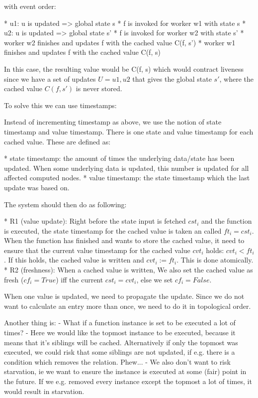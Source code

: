 with event order:

* u1: u is updated => global state s
* f is invoked for worker w1 with state s
* u2: u is updated => global state s'
* f is invoked for worker w2 with state s'
* worker w2 finishes and updates f with the cached value C(f, s')
* worker w1 finishes and updates f with the cached value C(f, s)

In this case, the resulting value would be C(f, s) which would contract
liveness since we have a set of updates $U = {u1, u2}$ that gives the global
state $s'$, where the cached value $C(f, s')$ is never stored.

To solve this we can use timestamps:

Instead of incrementing timestamp as above, we use the notion of state timestamp
and value timestamp. There is one state and value timestamp for each cached
value. These are defined as:

* state timestamp: the amount of times the underlying data/state has been
  updated. When some underlying data is updated, this number is updated for
  all affected computed nodes.
* value timestamp: the state timestamp which the last update was based on.

The system should then do as following:

* R1 (value update): Right before the state input is fetched $cst_i$ and the function is executed,
  the state timestamp for the cached value is taken an called $ft_i = cst_i$. When the function
  has finished and wants to store the cached value, it need to ensure that
  the current value timestamp for the cached value $cvt_i$ holds: $cvt_i < ft_i$.
  If this holds, the cached value is written and $cvt_i := ft_i$. This is done
  atomically.
* R2 (freshness): When a cached value is written, We also set the cached value as fresh
  ($cf_i = True$) iff the current $cst_i = cvt_i$, else we set $cf_i = False$.



When one value is updated, we need to propagate the update. Since we do not
want to calculate an entry more than once, we need to do it in topological
order.

Another thing is:
- What if a function instance is set to be executed a lot of times?
  - Here we would like the topmost instance to be executed, because it
    means that it's siblings will be cached. Alternatively if only the
    topmost was executed, we could risk that some siblings are not updated,
    if e.g. there is a condition which removes the relation. Phew...
  - We also don't want to risk starvation, ie we want to ensure the instance
    is executed at some (fair) point in the future. If we e.g. removed every
    instance except the topmost a lot of times, it would result in starvation.


